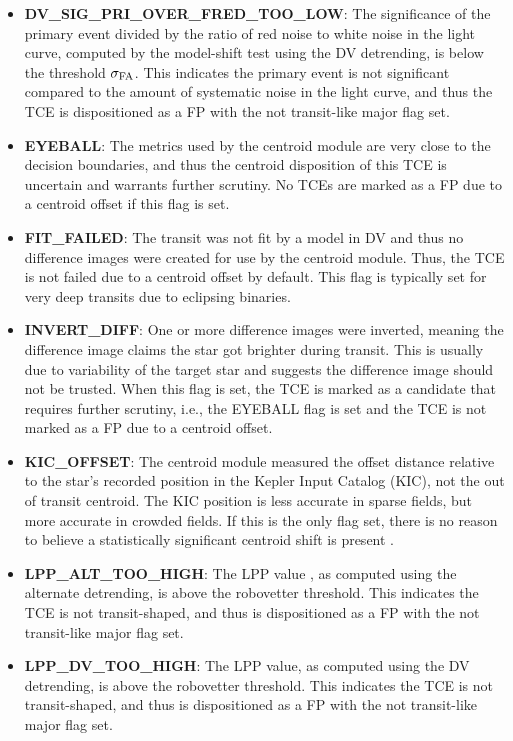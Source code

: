 \begin{itemize}
\item[] \textbf{DV\_SIG\_PRI\_OVER\_FRED\_TOO\_LOW}: The significance of the primary event divided by the ratio of red noise to white noise in the light curve, computed by the model-shift test using the DV detrending, is below the threshold $\sigma_{\rm FA}$. This indicates the primary event is not significant compared to the amount of systematic noise in the light curve, and thus the TCE is dispositioned as a FP with the not transit-like major flag set.  
\item[] \textbf{EYEBALL}: The metrics used by the centroid module are very close to the decision boundaries, and thus the centroid disposition of this TCE is uncertain and warrants further scrutiny. No TCEs are marked as a FP due to a centroid offset if this flag is set.
\item[] \textbf{FIT\_FAILED}: The transit was not fit by a model in DV and thus no difference images were created for use by the centroid module. Thus, the TCE is not failed due to a centroid offset by default. This flag is typically set for very deep transits due to eclipsing binaries.
\item[] \textbf{INVERT\_DIFF}: One or more difference images were inverted, meaning the difference image claims the star got brighter during transit. This is usually due to variability of the target star and suggests the difference image should not be trusted. When this flag is set, the TCE is marked as a candidate that requires further scrutiny, i.e., the EYEBALL flag is set and the TCE is not marked as a FP due to a centroid offset.
\item[] \textbf{KIC\_OFFSET}: The centroid module measured the offset distance relative to the star's recorded position in the Kepler Input Catalog (KIC), not the out of transit centroid. The KIC position is less accurate in sparse fields, but more accurate in crowded fields. If this is the only flag set, there is no reason to believe a statistically significant centroid shift is present \citep{Mullally2015c}.
\item[] \textbf{LPP\_ALT\_TOO\_HIGH}: The LPP value \citep{Thompson2015b}, as computed using the alternate detrending, is above the robovetter threshold. This indicates the TCE is not transit-shaped, and thus is dispositioned as a FP with the not transit-like major flag set.
\item[] \textbf{LPP\_DV\_TOO\_HIGH}: The LPP value, as computed using the DV detrending, is above the robovetter threshold. This indicates the TCE is not transit-shaped, and thus is dispositioned as a FP with the not transit-like major flag set.  

\end{itemize}
